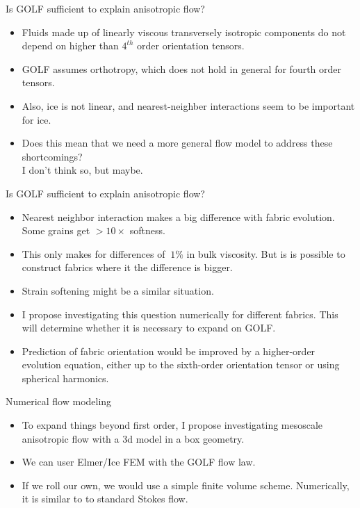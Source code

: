 \documentclass{beamer}
\begin{document}
\begin{frame}{Is GOLF sufficient to explain anisotropic flow?}
   \begin{itemize}
      \item Fluids made up of linearly viscous transversely isotropic components do not depend on higher than $4^{th}$ order orientation tensors.
      \item GOLF assumes orthotropy, which does not hold in general for fourth order tensors.
      \item Also, ice is not linear, and nearest-neighber interactions seem to be important for ice.
      \item Does this mean that we need a more general flow model to address these shortcomings? \\
         \pause I don't think so, but maybe.
   \end{itemize}
\end{frame}
\begin{frame}{Is GOLF sufficient to explain anisotropic flow?}
   \begin{itemize}
      \item Nearest neighbor interaction makes a big difference with fabric evolution. Some grains get $>10 \times$ softness.
      \item This only makes for differences of $~1\%$ in bulk viscosity. But is is possible to construct fabrics where it the difference is bigger.
      \item Strain softening might be a similar situation.
      \item I propose investigating this question numerically for different fabrics. This will determine whether it is necessary to expand on GOLF.
      \item Prediction of fabric orientation would be improved by a higher-order evolution equation, either up to the sixth-order orientation tensor or using spherical harmonics.
   \end{itemize}
\end{frame}
\begin{frame}{Numerical flow modeling}
   \begin{itemize}
      \item To expand things beyond first order, I propose investigating mesoscale anisotropic flow with a 3d model in a box geometry.
      \item We can user Elmer/Ice FEM with the GOLF flow law.
      \item If we roll our own, we would use a simple finite volume scheme. Numerically, it is similar to to standard Stokes flow.
   \end{itemize}
\end{frame}
\end{document}
